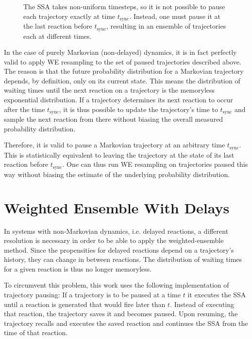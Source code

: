 \documentclass[english,letterpaper,12pt]{report}
\begin{document}
\begin{doublespacing}
\begin{figure}[ht]
    \centering
    \def\svgwidth{0.65\textwidth}
    
    \caption{The SSA takes non-uniform timesteps, so it is not possible to pause each trajectory exactly at time $t_\text{sync}$. Instead, one must pause it at the last reaction before $t_\text{sync}$, resulting in an ensemble of trajectories each at different times.}
    \label{fig:wessa-pause}
\end{figure}

In the case of purely Markovian (non-delayed) dynamics, it is in fact perfectly valid to apply WE resampling to the set of paused trajectories described above. The reason is that the future probability distribution for a Markovian trajectory depends, by definition, only on its current state. This means the distribution of waiting times until the next reaction on a trajectory is the memoryless exponential distribution. If a trajectory determines its next reaction to occur after the time $t_\text{sync}$, it is thus possible to update the trajectory's time to $t_\text{sync}$ and sample the next reaction from there without biasing the overall measured probability distribution.

Therefore, it is valid to pause a Markovian trajectory at an arbitrary time $t_\text{sync}$. This is statistically equivalent to leaving the trajectory at the state of its last reaction before $t_\text{sync}$. One can thus run WE resampling on trajectories paused this way without biasing the estimate of the underlying probability distribution.


\section{Weighted Ensemble With Delays} %
\label{sub:we-delays}

In systems with non-Markovian dynamics, i.e. delayed reactions, a different resolution is necessary in order to be able to apply the weighted-ensemble method. Since the propensities for delayed reactions depend on a trajectory's history, they can change in between reactions. The distribution of waiting times for a given reaction is thus no longer memoryless.

To circumvent this problem, this work uses the following implementation of trajectory pausing: If a trajectory is to be paused at a time $t$ it executes the SSA until a reaction is generated that would fire later than $t$. Instead of executing that reaction, the trajectory saves it and becomes paused. Upon resuming, the trajectory recalls and executes the saved reaction and continues the SSA from the time of that reaction.


\end{doublespacing}
\end{document}

